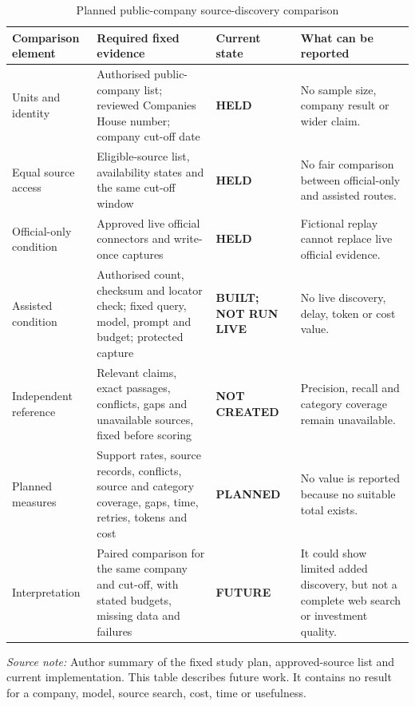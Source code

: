 \clearpage
\begin{table}[p]
  \centering
  \scriptsize
  \setlength{\tabcolsep}{3pt}
  \renewcommand{\arraystretch}{1.08}
  \begin{tabularx}{\textwidth}{@{}P{0.21\textwidth}P{0.29\textwidth}P{0.19\textwidth}Y@{}}
    \toprule
    \textbf{Comparison element} & \textbf{Required fixed evidence} & \textbf{Current state} & \textbf{What can be reported} \\
    \midrule
    Units and identity & Authorised public-company list; reviewed Companies House number; company cut-off date & \textbf{HELD} & No sample size, company result or wider claim. \\
    Equal source access & Eligible-source list, availability states and the same cut-off window & \textbf{HELD} & No fair comparison between official-only and assisted routes. \\
    Official-only condition & Approved live official connectors and write-once captures & \textbf{HELD} & Fictional replay cannot replace live official evidence. \\
    Assisted condition & Authorised count, checksum and locator check; fixed query, model, prompt and budget; protected capture & \textbf{BUILT; NOT RUN LIVE} & No live discovery, delay, token or cost value. \\
    Independent reference & Relevant claims, exact passages, conflicts, gaps and unavailable sources, fixed before scoring & \textbf{NOT CREATED} & Precision, recall and category coverage remain unavailable. \\
    Planned measures & Support rates, source records, conflicts, source and category coverage, gaps, time, retries, tokens and cost & \textbf{PLANNED} & No value is reported because no suitable total exists. \\
    Interpretation & Paired comparison for the same company and cut-off, with stated budgets, missing data and failures & \textbf{FUTURE} & It could show limited added discovery, but not a complete web search or investment quality. \\
    \bottomrule
  \end{tabularx}

  \caption{Planned public-company source-discovery comparison}
  \label{tab:eval-held-company-comparison}

  \vspace{4pt}
  \parbox{\textwidth}{\scriptsize
    \textit{Source note:} Author summary of the fixed study plan, approved-source list and current
    implementation. This table describes future work. It contains no result for a company, model,
    source search, cost, time or usefulness.}
\end{table}
\clearpage
